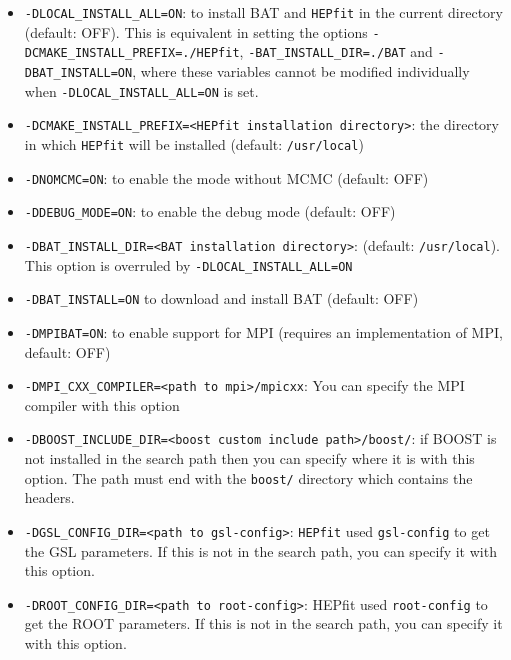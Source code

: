 \documentclass[preprint,3p,12pt]{elsarticle}
\newcommand{\HEPfit}{\texttt{HEPfit}\xspace}
\begin{document}
\begin{itemize}
\item \texttt{-DLOCAL\_INSTALL\_ALL=ON}: to install BAT and \HEPfit in the current directory (default: OFF). 
    This is equivalent in setting the options \texttt{-DCMAKE\_INSTALL\_PREFIX=./HEPfit}, 
    \texttt{-BAT\_INSTALL\_DIR=./BAT} and \texttt{-DBAT\_INSTALL=ON}, where these variables cannot 
    be modified individually when \texttt{-DLOCAL\_INSTALL\_ALL=ON} is set. 

\item \texttt{-DCMAKE\_INSTALL\_PREFIX=<HEPfit installation directory>}: the directory in which \HEPfit will be installed (default: \texttt{/usr/local})  
  
\item \texttt{-DNOMCMC=ON}: to enable the mode without MCMC (default: OFF)

\item \texttt{-DDEBUG\_MODE=ON}: to enable the debug mode (default: OFF)

\item \texttt{-DBAT\_INSTALL\_DIR=<BAT installation directory>}: (default: \texttt{/usr/local}). This option is overruled by \texttt{-DLOCAL\_INSTALL\_ALL=ON}

\item \texttt{-DBAT\_INSTALL=ON} to download and install BAT (default: OFF)

\item \texttt{-DMPIBAT=ON}: to enable support for MPI
    (requires an implementation of MPI, default: OFF)

\item \texttt{-DMPI\_CXX\_COMPILER=<path to mpi>/mpicxx}: You can specify the MPI compiler with this option

\item \texttt{-DBOOST\_INCLUDE\_DIR=<boost custom include path>/boost/}: if BOOST is not installed in the search path then you can specify where it is with this option. The path must end with the \texttt{boost/} directory which contains the headers.

\item \texttt{-DGSL\_CONFIG\_DIR=<path to gsl-config>}: \HEPfit used \texttt{gsl-config} to get the GSL parameters. If this is not in the search path, you can specify it with this option. 

\item \texttt{-DROOT\_CONFIG\_DIR=<path to root-config>}: HEPfit used \texttt{root-config} to get the ROOT parameters. If this is not in the search path, you can specify it with this option. 
\end{itemize}
\end{document}
